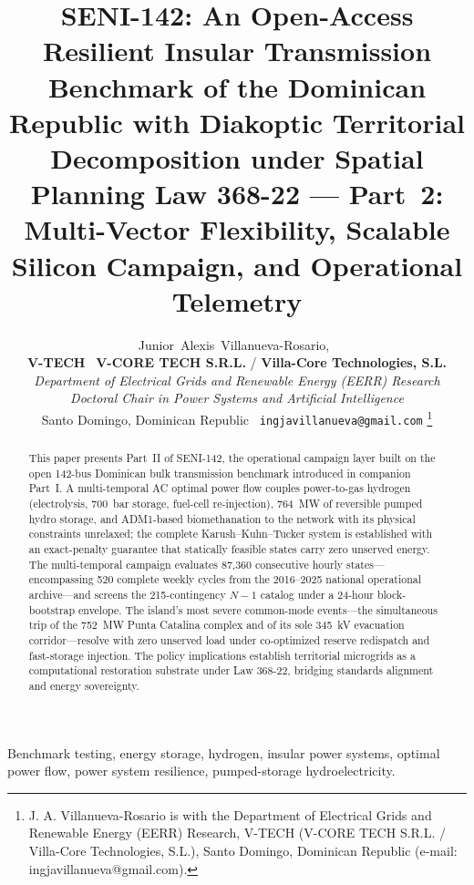 \documentclass[10pt, journal]{IEEEtran}
\title{SENI-142: An Open-Access Resilient Insular Transmission Benchmark of the Dominican Republic with Diakoptic Territorial Decomposition under Spatial Planning Law 368-22 --- Part~2: Multi-Vector Flexibility, Scalable Silicon Campaign, and Operational Telemetry}
\author{Junior~Alexis~Villanueva-Rosario,~\IEEEmembership{Ms.C., Ph.D.(c)}\\[0.3em]
{\normalsize\textnormal{\textbf{V-TECH} \textbar\ \textbf{V-CORE TECH S.R.L.} / \textbf{Villa-Core Technologies, S.L.}}}\\[0.15em]
{\footnotesize\textnormal{\textit{Department of Electrical Grids and Renewable Energy (EERR) Research}}}\\[0.15em]
{\footnotesize\textnormal{\textit{Doctoral Chair in Power Systems and Artificial Intelligence}}}\\[0.15em]
{\footnotesize\textnormal{Santo Domingo, Dominican Republic \textbar\ \texttt{ingjavillanueva@gmail.com}}}%
\thanks{J. A. Villanueva-Rosario is with the Department of Electrical Grids and Renewable Energy (EERR) Research, V-TECH (V-CORE TECH S.R.L. / Villa-Core Technologies, S.L.), Santo Domingo, Dominican Republic (e-mail: ingjavillanueva@gmail.com).}}
\begin{document}
\maketitle
\begin{abstract}
This paper presents Part~II of SENI-142, the operational campaign layer built on the open 142-bus Dominican bulk transmission benchmark introduced in companion Part~I. A multi-temporal AC optimal power flow couples power-to-gas hydrogen (electrolysis, 700~bar storage, fuel-cell re-injection), 764~MW of reversible pumped hydro storage, and ADM1-based biomethanation to the network with its physical constraints unrelaxed; the complete Karush--Kuhn--Tucker system is established with an exact-penalty guarantee that statically feasible states carry zero unserved energy. The multi-temporal campaign evaluates 87,360 consecutive hourly states---encompassing 520 complete weekly cycles from the 2016--2025 national operational archive---and screens the 215-contingency $N-1$ catalog under a 24-hour block-bootstrap envelope. The island's most severe common-mode events---the simultaneous trip of the 752~MW Punta Catalina complex and of its sole 345~kV evacuation corridor---resolve with zero unserved load under co-optimized reserve redispatch and fast-storage injection. The policy implications establish territorial microgrids as a computational restoration substrate under Law 368-22, bridging standards alignment and energy sovereignty.
\end{abstract}

\begin{IEEEkeywords}
Benchmark testing, energy storage, hydrogen, insular power systems, optimal power flow, power system resilience, pumped-storage hydroelectricity.
\end{IEEEkeywords}

\setlength{\textfloatsep}{12pt plus 2pt minus 4pt}%
\setlength{\dbltextfloatsep}{12pt plus 2pt minus 4pt}%
\setlength{\abovedisplayskip}{7pt plus 2pt minus 3pt}%
\setlength{\belowdisplayskip}{7pt plus 2pt minus 3pt}%
\setlength{\abovedisplayshortskip}{3pt plus 1pt minus 2pt}%
\setlength{\belowdisplayshortskip}{4pt plus 1pt minus 2pt}%







\end{document}
